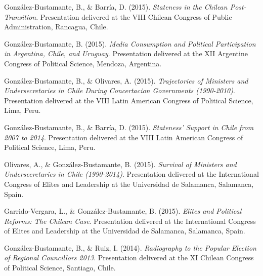 \begin{publications}
\begin{benumerate}{72}
\item{\small González-Bustamante, B., \& Barría, D. (2015). {\itshape Stateness in the Chilean Post-Transition}. Presentation delivered at the VIII Chilean Congress of Public Administration, Rancagua, Chile.}\vspace{1mm}

\item{\small González-Bustamante, B. (2015). {\itshape Media Consumption and Political Participation in Argentina, Chile, and Uruguay}. Presentation delivered at the XII Argentine Congress of Political Science, Mendoza, Argentina.}\vspace{1mm}

\item{\small González-Bustamante, B., \& Olivares, A. (2015). {\itshape Trajectories of Ministers and Undersecretaries in Chile During Concertacion Governments (1990-2010)}. Presentation delivered at the VIII Latin American Congress of Political Science, Lima, Peru.}\vspace{1mm}

\item{\small González-Bustamante, B., \& Barría, D. (2015). {\itshape Stateness' Support in Chile from 2007 to 2014}. Presentation delivered at the VIII Latin American Congress of Political Science, Lima, Peru.}\vspace{1mm}

\item{\small Olivares, A., \& González-Bustamante, B. (2015). {\itshape Survival of Ministers and Undersecretaries in Chile (1990-2014)}. Presentation delivered at the International Congress of Elites and Leadership at the Universidad  de Salamanca, Salamanca, Spain.}\vspace{1mm}

\item{\small Garrido-Vergara, L., \& González-Bustamante, B. (2015). {\itshape Elites and Political Reforms: The Chilean Case}. Presentation delivered at the International Congress of Elites and Leadership at the Universidad  de Salamanca, Salamanca, Spain.}\vspace{1mm}

\item{\small González-Bustamante, B., \& Ruiz, I. (2014). {\itshape Radiography to the Popular Election of Regional Councillors 2013}. Presentation delivered at the XI Chilean Congress of Political Science, Santiago, Chile.}\vspace{1mm}


\end{benumerate}
\end{publications}

